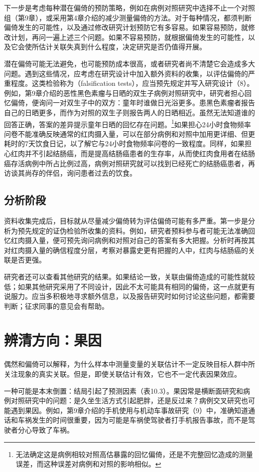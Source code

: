 下一步是考虑每种潜在偏倚的预防策略，例如在病例对照研究中选择不止一个对照组（第9章），或采用第4章介绍的减少测量偏倚的方法。对于每种情况，都须判断偏倚发生的可能性，以及通过修改研究计划预防它有多容易。如果容易预防，就修改计划，再问一遍上述三个问题。如果不容易预防，就根据偏倚发生的可能性，以及它会使所估计关联失真到什么程度，决定研究是否仍值得开展。

潜在偏倚可能无法避免，也可能预防成本很高，或者研究者尚不清楚它会造成多大问题。遇到这些情况，应考虑在研究设计中加入额外资料的收集，以评估偏倚的严重程度。这类检验称为（falsification tests），应当预先规定并写入研究设计（8）。例如，第9章介绍的恶性黑色素瘤与日晒的双生子病例对照研究中，研究者担心回忆偏倚，便询问一对双生子中的双方：童年时谁做日光浴更多。患黑色素瘤者报告自己的日晒更多，而作为对照的双生子则报告两人的日晒相近。虽然无法知道谁的回答正确，答案的差异提示童年日晒的回忆存在问题。\footnote{无法确定这是病例相较对照高估暴露的回忆偏倚，还是不完整回忆造成的测量误差，而这种误差对病例和对照的影响相似。}如果担心24小时食物频率问卷不能准确反映通常的红肉摄入量，可以在部分病例和对照中加用更详细、但更耗时的7天饮食日记，以了解它与24小时食物频率问卷的一致程度。同样，如果担心红肉并不引起结肠癌，而是提高结肠癌患者的生存率，从而使红肉食用者在结肠癌存活病例中所占比例过高，病例对照研究就可以找到已经死亡的结肠癌患者，再访谈其尚存的伴侣，询问患者过去的饮食。

\subsection{分析阶段}
资料收集完成后，目标就从尽量减少偏倚转为评估偏倚可能有多严重。第一步是分析为预先规定的证伪检验所收集的资料。例如，研究者预料参与者可能无法准确回忆红肉摄入量，便可预先询问病例和对照对自己的答案有多大把握。分析时再按其对红肉摄入量的确信程度分层，考察对暴露史更有把握的人中，红肉与结肠癌的关联是否更强。

研究者还可以查看其他研究的结果。如果结论一致，关联由偏倚造成的可能性就较低；如果其他研究采用了不同设计，因此不太可能具有相同的偏倚，这一点就更有说服力。应当多积极地寻求额外信息，以及报告研究时如何讨论这些问题，都需要判断；征求同事的意见会有帮助。

\section{辨清方向：果因}
偶然和偏倚可以解释，为什么样本中测量变量的关联估计不一定反映目标人群中所关注现象的真实关联。但是，即使关联估计有效，它也不一定代表因果效应。

一种可能是本末倒置：结局引起了预测因素（表10.3）。果因常是横断面研究和病例对照研究中的问题：是久坐生活方式引起肥胖，还是反过来？病例交叉研究也可能遇到果因。例如，第9章介绍的手机使用与机动车事故研究（9）中，准确知道通话和车祸发生的时间很重要，因为可能是车祸使驾驶者打手机报告事故，而不是驾驶者分心导致了车祸。

